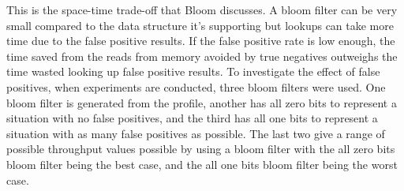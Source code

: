 This is the space-time trade-off that Bloom discusses. A bloom filter can be
very small compared to the data structure it's supporting but lookups can take
more time due to the false positive results. If the false positive rate is low
enough, the time saved from the reads from memory avoided by true negatives
outweighs the time wasted looking up false positive results. To investigate the
effect of false positives, when experiments are conducted, three bloom filters
were used. One bloom filter is generated from the profile, another has all zero
bits to represent a situation with no false positives, and the third has all one
bits to represent a situation with as many false positives as possible. The last
two give a range of possible throughput values possible by using a bloom filter
with the all zero bits bloom filter being the best case, and the all one bits
bloom filter being the worst case.
